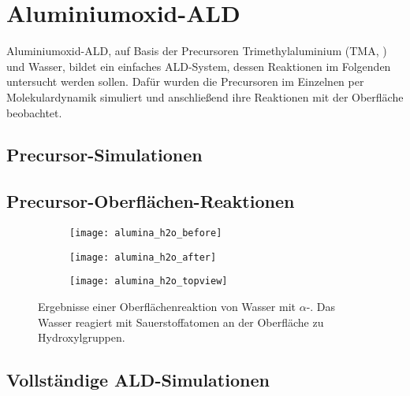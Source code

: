 \section{Aluminiumoxid-ALD}
\label{aluminaald}

Aluminiumoxid-ALD, auf Basis der Precursoren Trimethylaluminium (TMA, ) und Wasser, bildet ein einfaches ALD-System, dessen Reaktionen im Folgenden untersucht werden sollen.
Dafür wurden die Precursoren im Einzelnen per Molekulardynamik simuliert und anschließend ihre Reaktionen mit der Oberfläche beobachtet.

\subsection{Precursor-Simulationen}

\subsection{Precursor-Oberflächen-Reaktionen}

\begin{figure}
  \captionsetup[subfigure]{singlelinecheck=false}
  \def\subfigwidth{0.32\textwidth}
  \begin{subfigure}[t]{\subfigwidth}
    \texttt{[image: alumina\_h2o\_before]}
  \end{subfigure}
  \hfill
  \begin{subfigure}[t]{\subfigwidth}
    \texttt{[image: alumina\_h2o\_after]}
  \end{subfigure}
  \hfill
  \begin{subfigure}[t]{\subfigwidth}
    \texttt{[image: alumina\_h2o\_topview]}
  \end{subfigure}
  \caption[Oberflächenreaktion von Wasser mit $\alpha$-]{Ergebnisse einer Oberflächenreaktion von Wasser mit $\alpha$-.
    Das Wasser reagiert mit Sauerstoffatomen an der Oberfläche zu Hydroxylgruppen.
  }
  \label{fig:wateraluminasurface}
\end{figure}

\subsection{Vollständige ALD-Simulationen}

